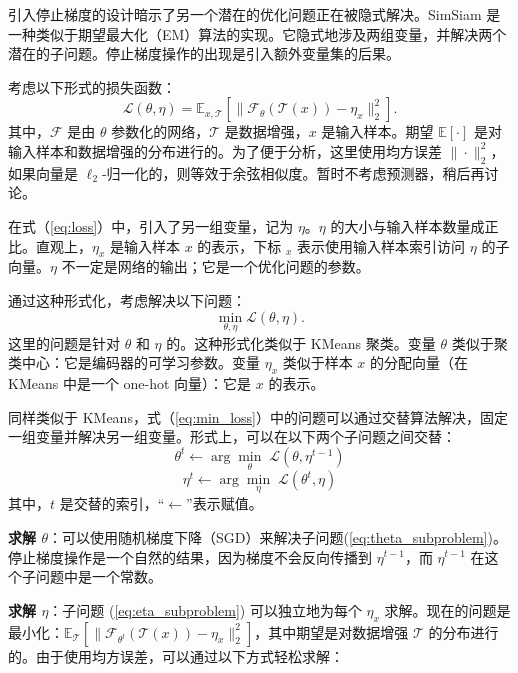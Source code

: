 \documentclass[master]{thesis-uestc}
\begin{document}
引入停止梯度的设计暗示了另一个潜在的优化问题正在被隐式解决。SimSiam 是一种类似于期望最大化（EM）算法的实现。它隐式地涉及两组变量，并解决两个潜在的子问题。停止梯度操作的出现是引入额外变量集的后果。

考虑以下形式的损失函数：
\begin{equation}
\label{eq:loss}
\mathcal{L}(\theta,\eta)=\mathbb{E}_{x,\mathcal{T}}\left[\|\mathcal{F}_{\theta} (\mathcal{T}(x))-\eta_{x}\|^{2}_{2}\right].
\end{equation}
其中，$\mathcal{F}$ 是由 $\theta$ 参数化的网络，$\mathcal{T}$ 是数据增强，$x$ 是输入样本。期望 $\mathbb{E}[\cdot]$ 是对输入样本和数据增强的分布进行的。为了便于分析，这里使用均方误差 $\|\cdot\|^{2}_{2}$，如果向量是 $\ell_{2}$-归一化的，则等效于余弦相似度。暂时不考虑预测器，稍后再讨论。

在式（\ref{eq:loss}）中，引入了另一组变量，记为 $\eta$。$\eta$ 的大小与输入样本数量成正比。直观上，$\eta_{x}$ 是输入样本 $x$ 的表示，下标 ${}_{x}$ 表示使用输入样本索引访问 $\eta$ 的子向量。$\eta$ 不一定是网络的输出；它是一个优化问题的参数。

通过这种形式化，考虑解决以下问题：
\begin{equation}
\label{eq:min_loss}
\min_{\theta,\eta}\mathcal{L}(\theta,\eta).
\end{equation}
这里的问题是针对 $\theta$ 和 $\eta$ 的。这种形式化类似于 KMeans 聚类。变量 $\theta$ 类似于聚类中心：它是编码器的可学习参数。变量 $\eta_{x}$ 类似于样本 $x$ 的分配向量（在 KMeans 中是一个 one-hot 向量）：它是 $x$ 的表示。

同样类似于 KMeans，式（\ref{eq:min_loss}）中的问题可以通过交替算法解决，固定一组变量并解决另一组变量。形式上，可以在以下两个子问题之间交替：
\begin{equation}
\label{eq:theta_subproblem}
\theta^{t} \leftarrow \arg\min_{\theta}\;\mathcal{L}(\theta,\eta^{t-1})
\end{equation}
\begin{equation}
\label{eq:eta_subproblem}
\eta^{t} \leftarrow \arg\min_{\eta}\;\mathcal{L}(\theta^{t},\eta)
\end{equation}
其中，$t$ 是交替的索引，“$\leftarrow$”表示赋值。

\textbf{求解 $\theta$}：可以使用随机梯度下降（SGD）来解决子问题(\ref{eq:theta_subproblem})。停止梯度操作是一个自然的结果，因为梯度不会反向传播到 $\eta^{t-1}$，而 $\eta^{t-1}$ 在这个子问题中是一个常数。

\textbf{求解 $\eta$}：子问题 (\ref{eq:eta_subproblem}) 可以独立地为每个 $\eta_{x}$ 求解。现在的问题是最小化：$\mathbb{E}_{\mathcal{T}}\left[\|\mathcal{F}_{\theta^{t}}(\mathcal{T}(x))-\eta_{x} \|_{2}^{2}\right]$，其中期望是对数据增强 $\mathcal{T}$ 的分布进行的。由于使用均方误差，可以通过以下方式轻松求解：
\end{document}
